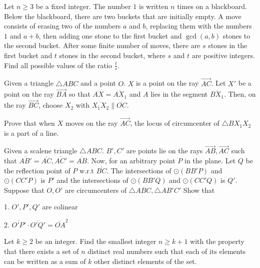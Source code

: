 \documentclass[11pt]{scrartcl}
\begin{document}
\begin{problem}[1743818063911276331]
Let $n \geq 3$ be a fixed integer. The number $1$ is written $n$ times on a blackboard. Below the blackboard, there are two buckets that are initially empty. A move consists of erasing two of the numbers $a$ and $b$, replacing them with the numbers $1$ and $a+b$, then adding one stone to the first bucket and $\gcd(a, b)$ stones to the second bucket. After some finite number of moves, there are $s$ stones in the first bucket and $t$ stones in the second bucket, where $s$ and $t$ are positive integers. Find all possible values of the ratio $\frac{t}{s}$.
\end{problem}
\begin{problem}[1790114062253914451]
	Given a triangle $ \triangle{ABC} $ and a point $ O $. $ X $ is a point on the ray $ \overrightarrow{AC} $. Let $ X' $ be a point on the ray $ \overrightarrow{BA} $ so that $ \overline{AX} = \overline{AX_{1}} $ and $ A $ lies in the segment $ \overline{BX_{1}} $. Then, on the ray $ \overrightarrow{BC} $, choose $ X_{2} $ with $ \overline{X_{1}X_{2}} \parallel \overline{OC} $.

Prove that when $ X $ moves on the ray $ \overrightarrow{AC} $, the locus of circumcenter of $ \triangle{BX_{1}X_{2}} $ is a part of a line.
\end{problem}
\begin{problem}[1810915585111530473]
	Given a scalene triangle $ \triangle ABC $. $ B', C' $ are points lie on the rays $ \overrightarrow{AB}, \overrightarrow{AC}  $ such that $ \overline{AB'} = \overline{AC}, \overline{AC'} = \overline{AB} $. Now, for an arbitrary point $ P $ in the plane. Let $ Q $ be the reflection point of $ P $ w.r.t $ \overline{BC} $. The intersections of $ \odot{\left(BB'P\right)} $ and $ \odot{\left(CC'P\right)} $ is $ P' $ and the intersections of $ \odot{\left(BB'Q\right)} $ and $ \odot{\left(CC'Q\right)} $ is $ Q' $. Suppose that $ O, O' $ are circumcenters of $ \triangle{ABC}, \triangle{AB'C'} $ Show that

1. $ O', P', Q' $ are colinear

2. $  \overline{O'P'} \cdot  \overline{O'Q'} = \overline{OA}^{2} $
\end{problem}
\begin{problem}[1837105952530316058]
Let $k\ge2$ be an integer. Find the smallest integer $n \ge k+1$ with the property that there exists a set of $n$ distinct real numbers such that each of its elements can be written as a sum of $k$ other distinct elements of the set.
\end{problem}
\end{document}
